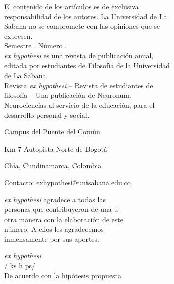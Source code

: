 {\begin{flushleft}
El contenido de los artículos es de exclusiva\\
responsabilidad de los autores. La Universidad de La\\
Sabana no se compromete con las opiniones que se\\
expresen.\\

Semestre \semestre{}. Número \numeroRevista{}.\\

\textit{ex hypothesi} es una revista de publicación anual,\\
editada por estudiantes de Filosofía de la Universidad\\
de La Sabana.\\

Revista \textit{ex hypothesi} – Revista de estudiantes de\\
filosofía – Una publicación de Neuronum.\\
Neurociencias al servicio de la educación, para el\\
desarrollo personal y social.

Campus del Puente del Común

Km 7 Autopista Norte de Bogotá

Chía, Cundinamarca, Colombia

\noindent Contacto: \href{mailto:exhypothesi@unisabana.edu.co}{exhypothesi@unisabana.edu.co}

\end{flushleft}

\newpage

\begin{flushleft}
	\textit{ex hypothesi} agradece a todas las\\
	personas que contribuyeron de una u\\
	otra manera con la elaboración de este\\
	número. A ellos les agradecemos\\
	inmensamente por sus aportes.\\[6cm]
\end{flushleft}

\begin{flushright}
	\textit{ex hypothesi}\\
	/ˌ\textepsilon ks h\textturnv \textsci ˈp\textturnscripta \texttheta \textschwa s\textturnv \textsci/\\
	De acuerdo con la hipótesis propuesta
\end{flushright}

}			%